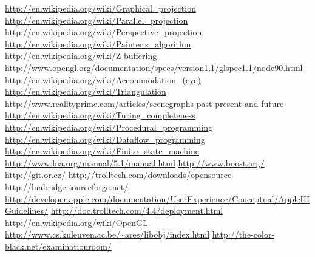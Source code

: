 \begin{thebibliography}{12}
 \url{http://en.wikipedia.org/wiki/Graphical_projection}
 \url{http://en.wikipedia.org/wiki/Parallel_projection}
 \url{http://en.wikipedia.org/wiki/Perspective_projection}
 \url{http://en.wikipedia.org/wiki/Painter's_algorithm}
 \url{http://en.wikipedia.org/wiki/Z-buffering}
 \url{http://www.opengl.org/documentation/specs/version1.1/glspec1.1/node90.html}
 \url{http://en.wikipedia.org/wiki/Accommodation_(eye)}
 \url{http://en.wikipedia.org/wiki/Triangulation}
 \url{http://www.realityprime.com/articles/scenegraphs-past-present-and-future}
 \url{http://en.wikipedia.org/wiki/Turing_completeness}
 \url{http://en.wikipedia.org/wiki/Procedural_programming}
 \url{http://en.wikipedia.org/wiki/Dataflow_programming}
 \url{http://en.wikipedia.org/wiki/Finite_state_machine}
 \url{http://www.lua.org/manual/5.1/manual.html}
 \url{http://www.boost.org/}
 \url{http://git.or.cz/}
 \url{http://trolltech.com/downloads/opensource}
 \url{http://luabridge.sourceforge.net/}
 \url{http://developer.apple.com/documentation/UserExperience/Conceptual/AppleHIGuidelines/}
 \url{http://doc.trolltech.com/4.4/deployment.html}
 \url{http://en.wikipedia.org/wiki/OpenGL}
 \url{http://www.cs.kuleuven.ac.be/~ares/libobj/index.html}
 \url{http://the-color-black.net/examinationroom/}
\end{thebibliography}
